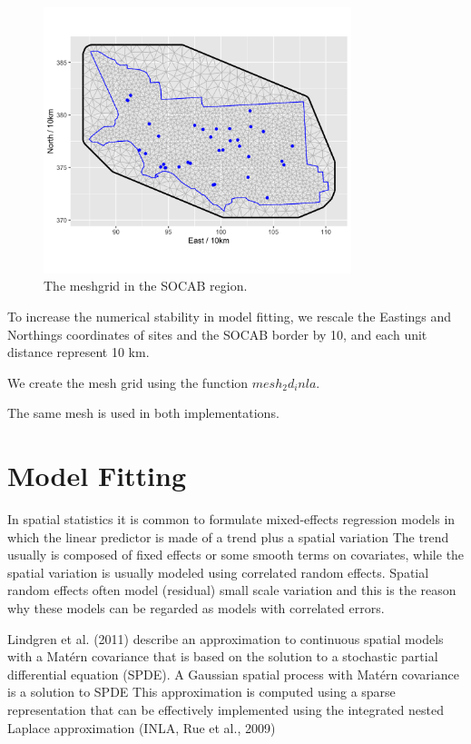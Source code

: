 \begin{figure}[ht]
	\centering
	\includegraphics[width = 0.8\textwidth]{socab_plots/SOCAB_meshgrid.png}
	\caption{The meshgrid in the SOCAB region.}
	\label{fig:socab_meshgrid}
\end{figure}

To increase the numerical stability in model fitting, we rescale the Eastings and Northings 
coordinates of sites and the SOCAB border by 10, and each unit distance represent 10 km.

We create the mesh grid using the function $mesh_2d_inla$. 

The same mesh is used in both implementations. 


\section{Model Fitting}
In spatial statistics it is common to formulate mixed-effects regression models in which the linear predictor is made of a trend plus a spatial variation
The trend usually is composed of fixed effects or some smooth terms on covariates, while the spatial variation is usually modeled using correlated random effects.
Spatial random effects often model (residual) small scale variation and this is the reason why these models can be regarded as models with correlated errors.

Lindgren et al. (2011) describe an approximation to continuous spatial models with a Matérn
covariance that is based on the solution to a stochastic partial differential equation (SPDE). 
A Gaussian spatial process with Matérn covariance is a solution to SPDE
This approximation is computed using a sparse representation that can be effectively implemented using the integrated nested Laplace approximation (INLA, Rue et al., 2009)

